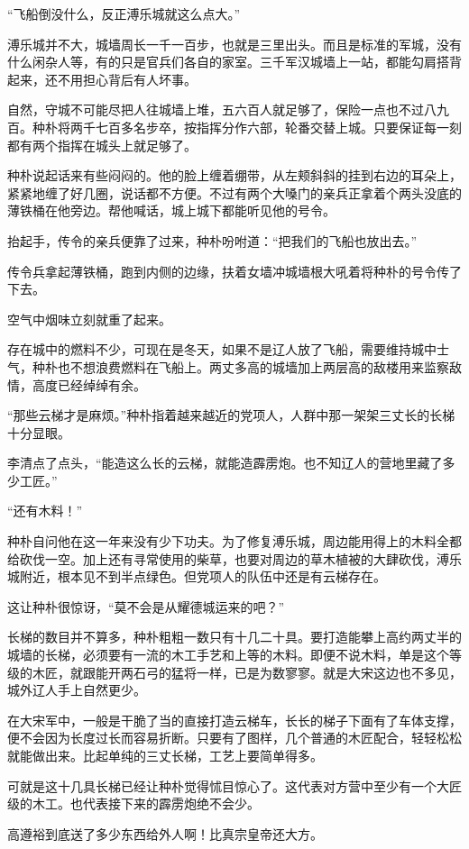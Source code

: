 “飞船倒没什么，反正溥乐城就这么点大。” 

溥乐城并不大，城墙周长一千一百步，也就是三里出头。而且是标准的军城，没有什么闲杂人等，有的只是官兵们各自的家室。三千军汉城墙上一站，都能勾肩搭背起来，还不用担心背后有人坏事。 

自然，守城不可能尽把人往城墙上堆，五六百人就足够了，保险一点也不过八九百。种朴将两千七百多名步卒，按指挥分作六部，轮番交替上城。只要保证每一刻都有两个指挥在城头上就足够了。 

种朴说起话来有些闷闷的。他的脸上缠着绷带，从左颊斜斜的挂到右边的耳朵上，紧紧地缠了好几圈，说话都不方便。不过有两个大嗓门的亲兵正拿着个两头没底的薄铁桶在他旁边。帮他喊话，城上城下都能听见他的号令。 

抬起手，传令的亲兵便靠了过来，种朴吩咐道：“把我们的飞船也放出去。” 

传令兵拿起薄铁桶，跑到内侧的边缘，扶着女墙冲城墙根大吼着将种朴的号令传了下去。 

空气中烟味立刻就重了起来。 

存在城中的燃料不少，可现在是冬天，如果不是辽人放了飞船，需要维持城中士气，种朴也不想浪费燃料在飞船上。两丈多高的城墙加上两层高的敌楼用来监察敌情，高度已经绰绰有余。 

“那些云梯才是麻烦。”种朴指着越来越近的党项人，人群中那一架架三丈长的长梯十分显眼。 

李清点了点头，“能造这么长的云梯，就能造霹雳炮。也不知辽人的营地里藏了多少工匠。” 

“还有木料！” 

种朴自问他在这一年来没有少下功夫。为了修复溥乐城，周边能用得上的木料全都给砍伐一空。加上还有寻常使用的柴草，也要对周边的草木植被的大肆砍伐，溥乐城附近，根本见不到半点绿色。但党项人的队伍中还是有云梯存在。 

这让种朴很惊讶，“莫不会是从耀德城运来的吧？” 

长梯的数目并不算多，种朴粗粗一数只有十几二十具。要打造能攀上高约两丈半的城墙的长梯，必须要有一流的木工手艺和上等的木料。即便不说木料，单是这个等级的木匠，就跟能开两石弓的猛将一样，已是为数寥寥。就是大宋这边也不多见，城外辽人手上自然更少。 

在大宋军中，一般是干脆了当的直接打造云梯车，长长的梯子下面有了车体支撑，便不会因为长度过长而容易折断。只要有了图样，几个普通的木匠配合，轻轻松松就能做出来。比起单纯的三丈长梯，工艺上要简单得多。 

可就是这十几具长梯已经让种朴觉得怵目惊心了。这代表对方营中至少有一个大匠级的木工。也代表接下来的霹雳炮绝不会少。 

高遵裕到底送了多少东西给外人啊！比真宗皇帝还大方。 

